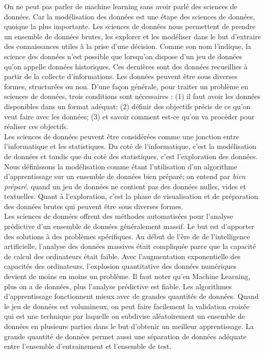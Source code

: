 \documentclass[12pt, french]{report}
\begin{document}
On ne peut pas parler de machine learning sans avoir parlé des sciences de données. Car la modélisation des données est une étape des sciences de données, quoique la plus importante. Les sciences de données nous permettent de prendre un ensemble de données brutes, les explorer et les modéliser dans le but d'extraire des connaissances utiles à la prise d'une décision. Comme son nom l'indique, la science des données n'est possible que lorsqu'on dispose d'un jeu de données qu'on appelle données historiques. Ces dernières sont des données recueillies à partir de la collecte d'informations. Les données peuvent être sous diverses formes, structurées ou non. D'une façon générale, pour traiter un problème en sciences de données, trois conditions sont nécessaires : (1) il faut avoir les données disponibles dans un format adéquat; (2) définir des objectifs précis de ce qu'on veut faire avec les données; (3) et savoir comment est-ce qu'on va procéder pour réaliser ces objectifs. \\

Les sciences de données peuvent être considérées comme une jonction entre l'informatique et les statistiques. Du coté de l'informatique, c'est la modélisation de données et tandis que du coté des statistiques, c'est l'exploration des données. Nous définissons la modélisation comme étant l'utilisation d'un algorithme d'apprentissage sur un ensemble de données bien préparé; on entend par \textit{bien préparé}, quand un jeu de données ne contient pas des données nulles, vides et textuelles.  Quant à l'exploration,  c'est la phase de visualisation et de préparation des données brutes qui peuvent être sous diverses formes. \\

Les sciences de données offrent des méthodes automatisées pour l'analyse prédictive d'un ensemble de données généralement massif. Le but est d'apporter des solutions à des problèmes spécifiques. Au début de l'ère de de l'intelligence artificielle, l'analyse des données massives était compliquée parce que la capacité de calcul des ordinateurs était faible. Avec l'augmentation exponentielle des capacités des ordinateurs, l'explosion quantitative des données numériques devient de moins en moins un problème. Il faut noter qu'en Machine Learning, plus on a de données, plus l'analyse prédictive est fiable. Les algorithmes d'apprentissage fonctionnent mieux avec de grandes quantités de données. Quand le jeu de données est volumineux, on peut faire facilement la validation croisée qui est une technique par laquelle on subdivise aléatoirement un ensemble de données en plusieurs parties dans le but d'obtenir un meilleur apprentissage. La grande quantité de données permet aussi une séparation de données adéquate entre l'ensemble d'entrainement et l'ensemble de test.\\  
\end{document}
